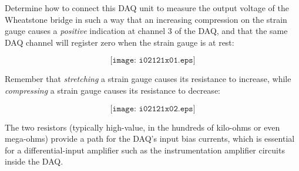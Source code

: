 

Determine how to connect this DAQ unit to measure the output voltage of the Wheatstone bridge in such a way that an increasing compression on the strain gauge causes a {\it positive} indication at channel 3 of the DAQ, and that the same DAQ channel will register zero when the strain gauge is at rest:

$$\texttt{[image: i02121x01.eps]}$$







Remember that {\it stretching} a strain gauge causes its resistance to increase, while {\it compressing} a strain gauge causes its resistance to decrease: 

$$\texttt{[image: i02121x02.eps]}$$

The two resistors (typically high-value, in the hundreds of kilo-ohms or even mega-ohms) provide a path for the DAQ's input bias currents, which is essential for a differential-input amplifier such as the instrumentation amplifier circuits inside the DAQ.











